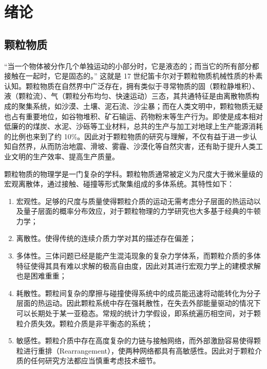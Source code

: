 
\chapter{绪论}

\section{颗粒物质}

“当一个物体被分作几个单独运动的小部分时，它是液态的；而当它的所有部分都接触在一起时，它是固态的。” 这就是 17 世纪笛卡尔对于颗粒物质机械性质的朴素认知。颗粒物质在自然界中广泛存在，拥有类似于寻常物质的固（颗粒静堆积）、液（颗粒流）、气（颗粒分布均匀、快速运动）三态\cite{RevModPhys.68.1259}，其共通特征是由离散物质构成的聚集系统，如沙漠、土壤、泥石流、沙尘暴；而在人类文明中，颗粒物质无疑也占有重要地位，如谷物堆积、矿石输运、药物粉末等生产行为。即使是成本相对低廉的的煤炭、水泥、沙砾等工业材料，总共的生产与加工对地球上生产能源消耗的比例也来到了约 \num{10}\%\cite{duran2000sands}。因此对于颗粒物质的研究与理解，不仅有益于进一步认知自然界，从而防治地震、滑坡、雾霾、沙漠化等自然灾害，还有助于提升人类工业文明的生产效率、提高生产质量。

颗粒物质的物理学是一门复杂的学科。颗粒物质通常被定义为尺度大于微米量级的宏观离散体，通过接触、碰撞等形式聚集组成的多体系统。其特性如下：

\begin{enumerate}
  \item 宏观性。足够的尺度与质量使得颗粒介质的运动无需考虑分子层面的热运动以及量子层面的概率分布效应，对于颗粒物理的力学研究也大多基于经典的牛顿力学；
  \item 离散性。使得传统的连续介质力学对其的描述存在偏差\cite{RevModPhys.71.435}；
  \item 多体性。三体问题已经是能产生混沌现象的复杂力学体系，而颗粒介质的多体特征使得其具有难以求解的极高自由度，因此对其进行宏观力学上的建模求解也是困难重重；
  \item 耗散性。颗粒间复杂的摩擦与碰撞使得系统中的成员能迅速将动能转化为分子层面的热运动。因此颗粒系统中存在强耗散性，在失去外部能量驱动的情况下可以长期处于某一亚稳态。常规的统计力学假设，即系统遍历相空间，对于颗粒介质失效。颗粒介质是非平衡态的系统；
  \item 敏感性。颗粒介质中存在高度复杂的力链与接触网络，而外部激励容易使得颗粒进行重排（Rearrangement），使两种网络都具有高敏感性。因此对于颗粒介质的任何研究方法都应当慎重考虑技术细节。
\end{enumerate}

